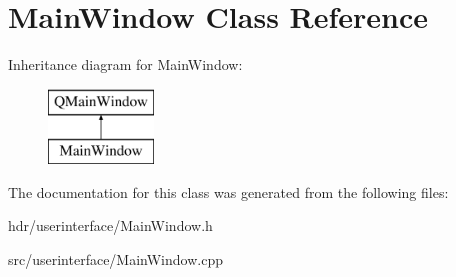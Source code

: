 \section{Main\-Window Class Reference}
\label{class_main_window}
Inheritance diagram for Main\-Window\-:\begin{figure}[H]
\begin{center}
\leavevmode
\includegraphics[height=2.000000cm]{class_main_window}
\end{center}
\end{figure}


The documentation for this class was generated from the following files\-:\begin{DoxyCompactItemize}
\item 
hdr/userinterface/Main\-Window.\-h\item 
src/userinterface/Main\-Window.\-cpp\end{DoxyCompactItemize}

